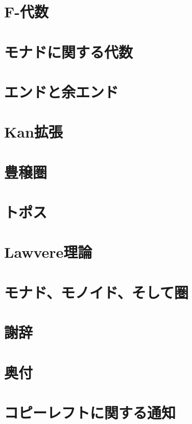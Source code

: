 \chapter{F-代数}\label{f-algebras}


\chapter{モナドに関する代数}\label{algebras-for-monads}


\chapter{エンドと余エンド}\label{ends-and-coends}


\chapter{Kan拡張}\label{kan-extensions}


\chapter{豊穣圏}\label{enriched-categories}


\chapter{トポス}\label{topoi}


\chapter{Lawvere理論}\label{lawvere-theories}


\chapter{モナド、モノイド、そして圏}\label{monads-monoids-categories}


\backmatter

\appendix
{}


\makeatletter\@openrightfalse
\chapter*{謝辞}\label{acknowledgments}


\chapter*{奥付}\label{colophon}


\chapter*{コピーレフトに関する通知}\label{copyleft}

\@openrighttrue\makeatother
\afterpage{\blankpage}